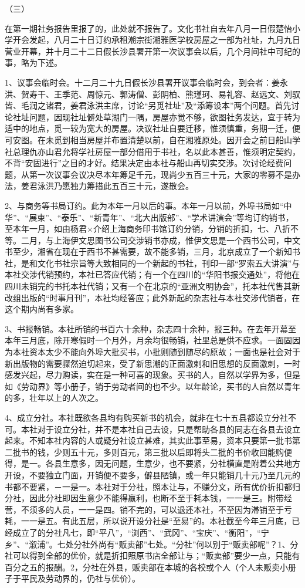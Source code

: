 （三）

在第一期社务报告里报了的，此处就不报告了。文化书社自去年八月一日假楚怡小学开会发起，八月二十日订约承租潮宗街湘雅医学校房屋之一部为社址，九月九日营业开幕，并十月二十二日假长沙县署开第一次议事会以后，几个月间社中可纪的事，略为下述。

1、议事会临时会。十二月二十九日假长沙县署开议事会临时会，到会者：姜永洪、贺寿干、王季范、周惊元、郭涛僧、彭阴柏、熊瑾珂、易礼容、赵远文、刘驭皆、毛润之诸君，姜君泳洪主席，讨论“另觅社址”及“添筹设本”两个问题。首先讨论社址问题，因现社址僻处草湖门一隅，房屋亦觉不够，欲图社务发达，宜于转为适中的地点，觅一较为宽大的房屋。决议社址自要迁移，惟须慎重，务期一迁，便可安图。在未觅到相当房屋并布置清楚以前，自在湘雅原处。因开会之前日船山学社总理仇亦山君允将学社房屋一部分借用于书社，名以此本甚善，惟须明定契约，不背“安固进行”之目的才好。结果决定由本社与船山再切实交涉。次讨论经费问题，从第一次议事会议决尽本年筹足千元，现尚少五百三十元，大家的零募不是办法，姜君泳洪乃愿独力筹措此五百三十元，遂散会。

2、与商务等书局订约。此为本年一月以后的事。本年一月以前，外埠书局如“中华”、“展束”、“泰乐”、“新青年”、“北大出版部”、“学术讲演会”等均订约销书，至本年一月，如由杨君×介绍上海商务印书馆订约分销，分销的折扣，七、八折不等。二月，与上海伊文思图书公司交涉销书亦成，惟伊文思是一个西书公司，中文书至少，湘省在现在于西书不甚需要，故不能多销，三月，北京成立了一个新知书社，是和文化书社宗旨等大致相同的一个新起的书社，刊印一部“罗索五大讲演”与本社交涉代销预约，本社已答应代销；有一个在四川的“华阳书报交通处”，将他在四川未销完的书托本社代销；又有一个在北京的“亚洲文明协会”，托本社代售其新改组出版的“时事月刊”，本社均经答应；此外新起的杂志社与本社交涉代销者，在这个期内尚有多家。

3、书报畅销。本社所销的书百六十余种，杂志四十余种，报三种。在去年开幕至本年三月底，除开寒假时一个月外，月余均很畅销，社里总是供不应求。一面固因为本社资本太少不能向外埠大批买书，小批则随到随尽的原故；一面也是社会对于新出版物的需要骤然迫切起来，受了新思潮的正面激剌和旧思想的反面激刺，一时感发兴起，尽力购读，实在是一种可喜的现象。买书的人，自然以学界为多，但是如《劳动界》等小册子，销于劳动者间的也不少。以年龄论，买书的人自然以青年的多，壮年以上的人次之。

4、成立分社。本社既欲各县均有购买新书的机会，就非在七十五县都设立分社不可。本社对于设立分社，并不是本社自己去设，只是帮助各县的同志在各县去设立起来。不知本社内容的人或疑分社设立甚难，其实此事至易，资本只要第一批书第二批书的钱，少则五十元，多则百元，第三批以后即将头二批的书价收回能购便得，是一。各县生意多，因无问题，生意少，也不要紧，分社横直是附着公共地方开设，不要独立门面，开销便不要多，僻县陋镇，或一年只能销几十元乃至几元的书都不要紧，－一是一。本社对于分社，照本让与，不赚分文，所有优价折扣都归分社，因此分社即因生意少不能得赢利，也断不至于耗本钱，一一是三。附带经营，不须多的人员，一一是四。销不完的，可以退还本社，不至因为滞销至于亏耗，一一是五。有此五层，所以说开设分社是“至易”的。本社截至今年三月底，已经成立了的分社凡七，即“平八”，“浏西”、“武冈”、“宝庆”、“衡阳”，“宁乡”、“溆浦”。七处分社外尚有“贩卖部”七处。“分社”何以别于“贩卖部呢”？1、分社可以得到全部的优价，就是折扣照原书店全部让与；“贩卖部”要少一点，只能有百分之五的报酬。2，分社在外县，贩卖部在本城的各校或个人（个人未贩卖小册子于平民及劳动界的，仍社与优价）。

